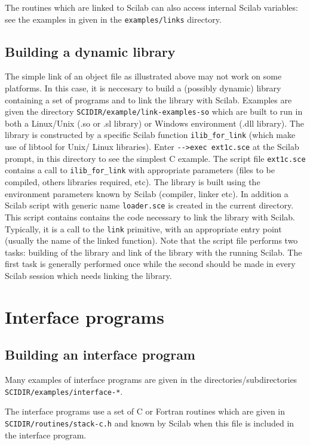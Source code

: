 The routines which are linked to Scilab can also access internal 
Scilab variables: see the examples in given in the {\tt examples/links}
directory. 

\subsection{Building a dynamic library}
The simple link of an object file as illustrated above may not work on some
platforms. In this case, it is neccesary to build a (possibly dynamic) library 
containing a set of programs and to link the library with Scilab.
Examples are given the directory {\tt SCIDIR/example/link-examples-so}
which are built to run in both a Linux/Unix (.so or .sl library) or 
Windows environment (.dll library). The library is constructed by a specific
Scilab function {\verb!ilib_for_link!} (which make use of libtool for Unix/
Linux libraries). 
Enter \verb!-->exec ext1c.sce! at the Scilab prompt, in this directory to
see the simplest C example. The script file {\tt ext1c.sce} contains a call
to  {\verb!ilib_for_link!} with appropriate parameters (files to be compiled,
others libraries required, etc). The library is built using the environment
parameters known by Scilab (compiler, linker etc). In addition a Scilab script 
with generic name {\tt loader.sce} is created in the current directory.
This script contains contains the code necessary to link the library with
Scilab. Typically, it is a call to the {\tt link} primitive, with an 
appropriate entry point (usually the name of the linked function).
Note that the script file performs two tasks: building of the library
and link of the library with the running Scilab. The first task is 
generally performed once while the second should be made in every Scilab 
session which needs linking the library.

\section{Interface programs}

\subsection{Building an interface program}
Many examples of interface programs are given in the 
directories/subdirectories {\tt SCIDIR/examples/interface-*}. 

The interface programs use a set of C or Fortran routines which
are given in {\tt SCIDIR/routines/stack-c.h} and known by Scilab
when this file is included in the interface program.

